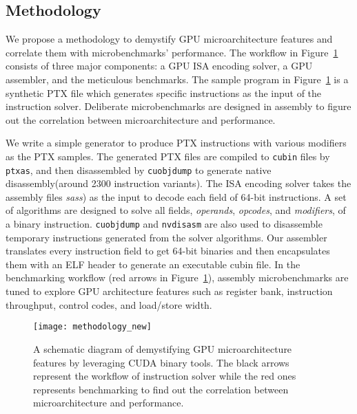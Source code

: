\subsection{Methodology}


We propose a methodology to demystify GPU microarchitecture features and correlate them with microbenchmarks' performance.
The workflow in Figure~\ref{fig:workflow} consists of three major components: a GPU ISA encoding solver, a GPU assembler, and the meticulous benchmarks.
The sample program in Figure~\ref{fig:workflow} is a synthetic PTX file which generates specific instructions as the input of the instruction solver.
Deliberate microbenchmarks are designed in assembly to figure out the correlation between microarchitecture and performance.

We write a simple generator to produce PTX instructions with various modifiers as the PTX samples.
The generated PTX files are compiled to {\tt cubin} files by {\tt ptxas}, and
then disassembled by {\tt cuobjdump} to generate native disassembly(around 2300 instruction variants). 
The ISA encoding solver takes the assembly files {\em sass}) as the input to decode each field of 64-bit instructions.
A set of algorithms are designed to solve all fields, {\em operands}, {\em opcodes}, and {\em modifiers}, of a binary instruction.
{\tt cuobjdump} and {\tt nvdisasm} are also used to disassemble temporary instructions generated from the solver algorithms.
Our assembler translates every instruction field to get 64-bit binaries and then encapsulates them with an ELF header to generate an executable cubin file.
In the benchmarking workflow (red arrows in Figure~\ref{fig:workflow}), assembly microbenchmarks are tuned to explore GPU architecture features such as register bank, instruction throughput, control codes, and load/store width.


\begin{figure}[htbp]
\begin{center}
    \texttt{[image: methodology\_new]}
\caption{A schematic diagram of demystifying GPU microarchitecture features by leveraging CUDA binary tools. The black arrows
    represent the workflow of instruction solver while the red ones represents benchmarking to find out the correlation between microarchitecture and performance.}
\label{fig:workflow}
\end{center}
\end{figure}
